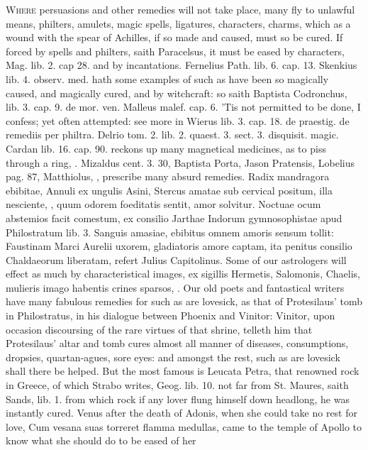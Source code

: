 {\lettrine{W}{here} persuasions and other remedies will not take place, many fly to
unlawful means, philters, amulets, magic spells, ligatures, characters,
charms, which as a wound with the spear of Achilles, if so made and
caused, must so be cured. If forced by spells and philters, saith
Paracelsus, it must be eased by characters, Mag. lib. 2. cap 28. and by
incantations. Fernelius Path. lib. 6. cap. 13. Skenkius lib. 4.
observ. med. hath some examples of such as have been so magically
caused, and magically cured, and by witchcraft: so saith Baptista
Codronchus, lib. 3. cap. 9. de mor. ven. Malleus malef. cap. 6. 'Tis
not permitted to be done, I confess; yet often attempted: see more in
Wierus lib. 3. cap. 18. de praestig. de remediis per philtra. Delrio
tom. 2. lib. 2. quaest. 3. sect. 3. disquisit. magic. Cardan lib. 16.
cap. 90. reckons up many magnetical medicines, as to piss through a
ring, \etc{}. Mizaldus cent. 3. 30, Baptista Porta, Jason Pratensis,
Lobelius pag. 87, Matthiolus, \etc{}, prescribe many absurd remedies.
Radix mandragora ebibitae, Annuli ex ungulis Asini, Stercus amatae sub
cervical positum, illa nesciente, \etc{}, quum odorem foeditatis sentit,
amor solvitur. Noctuae ocum abstemios facit comestum, ex consilio
Jarthae Indorum gymnosophistae apud Philostratum lib. 3. Sanguis
amasiae, ebibitus omnem amoris sensum tollit: Faustinam Marci Aurelii
uxorem, gladiatoris amore captam, ita penitus consilio Chaldaeorum
liberatam, refert Julius Capitolinus. Some of our astrologers will
effect as much by characteristical images, ex sigillis Hermetis,
Salomonis, Chaelis, \etc{} mulieris imago habentis crines sparsos, \etc{}. Our
old poets and fantastical writers have many fabulous remedies for such
as are lovesick, as that of Protesilaus' tomb in Philostratus, in his
dialogue between Phoenix and Vinitor: Vinitor, upon occasion
discoursing of the rare virtues of that shrine, telleth him that
Protesilaus' altar and tomb cures almost all manner of diseases,
consumptions, dropsies, quartan-agues, sore eyes: and amongst the rest,
such as are lovesick shall there be helped. But the most famous is
Leucata Petra, that renowned rock in Greece, of which Strabo
writes, Geog. lib. 10. not far from St. Maures, saith Sands, lib. 1.
from which rock if any lover flung himself down headlong, he was
instantly cured. Venus after the death of Adonis, when she could take
no rest for love, Cum vesana suas torreret flamma medullas, came
to the temple of Apollo to know what she should do to be eased of her
}

